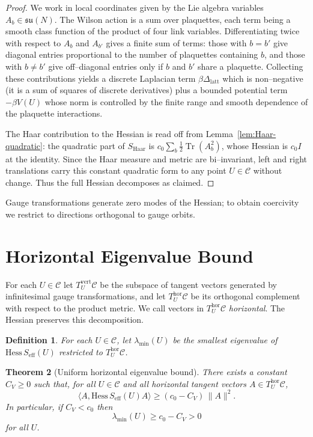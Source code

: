 \documentclass[11pt]{article}
\newtheorem{theorem}{Theorem}[section]
\newtheorem{definition}[theorem]{Definition}
\begin{document}
\begin{proof}
We work in local coordinates given by the Lie algebra variables
$A_b\in\mathfrak{su}(N)$.  The Wilson action is a sum over plaquettes,
each term being a smooth class function of the product of four link
variables.  Differentiating twice with respect to $A_b$ and $A_{b'}$
gives a finite sum of terms: those with $b=b'$ give diagonal entries
proportional to the number of plaquettes containing $b$, and those with
$b\neq b'$ give off--diagonal entries only if $b$ and $b'$ share a
plaquette.  Collecting these contributions yields a discrete Laplacian
term $\beta\Delta_{\mathrm{latt}}$ which is non--negative (it is a sum
of squares of discrete derivatives) plus a bounded potential term
$-\beta V(U)$ whose norm is controlled by the finite range and smooth
dependence of the plaquette interactions.

The Haar contribution to the Hessian is read off from
Lemma~\ref{lem:Haar-quadratic}: the quadratic part of
$S_{\mathrm{Haar}}$ is $c_0\sum_b \tfrac12\operatorname{Tr}(A_b^2)$,
whose Hessian is $c_0 I$ at the identity.  Since the Haar measure and
metric are bi--invariant, left and right translations carry this
constant quadratic form to any point $U\in\mathcal{C}$ without change.
Thus the full Hessian decomposes as claimed.
\end{proof}

Gauge transformations generate zero modes of the Hessian; to obtain
coercivity we restrict to directions orthogonal to gauge orbits.

\section{Horizontal Eigenvalue Bound}

For each $U\in\mathcal{C}$ let $T_U^{\mathrm{vert}}\mathcal{C}$ be the
subspace of tangent vectors generated by infinitesimal gauge
transformations, and let $T_U^{\mathrm{hor}}\mathcal{C}$ be its
orthogonal complement with respect to the product metric.  We call
vectors in $T_U^{\mathrm{hor}}\mathcal{C}$ \emph{horizontal}.  The
Hessian preserves this decomposition.

\begin{definition}
For each $U\in\mathcal{C}$, let $\lambda_{\min}(U)$ be the smallest
eigenvalue of $\mathrm{Hess}\,S_{\mathrm{eff}}(U)$ restricted to
$T_U^{\mathrm{hor}}\mathcal{C}$.
\end{definition}

\begin{theorem}[Uniform horizontal eigenvalue bound]
\label{thm:hor-gap}
There exists a constant $C_V\ge 0$ such that, for all $U\in\mathcal{C}$
and all horizontal tangent vectors $A\in T_U^{\mathrm{hor}}\mathcal{C}$,
\begin{equation}
  \langle A,\mathrm{Hess}\,S_{\mathrm{eff}}(U)A\rangle
  \ge (c_0 - C_V)\,\|A\|^2.
\end{equation}
In particular, if $C_V<c_0$ then
\begin{equation}
  \lambda_{\min}(U) \ge c_0-C_V > 0
\end{equation}
for all $U$.
\end{theorem}
\end{document}
